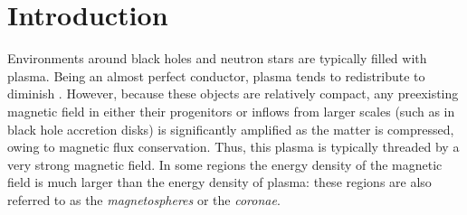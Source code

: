 \chapter{Introduction}

Environments around black holes and neutron stars are typically filled with plasma. Being an almost perfect conductor, plasma tends to redistribute to diminish . However, because these objects are relatively compact, any preexisting magnetic field in either their progenitors or inflows from larger scales (such as in black hole accretion disks) is significantly amplified as the matter is compressed, owing to magnetic flux conservation. Thus, this plasma is typically threaded by a very strong magnetic field. In some regions the energy density of the magnetic field is much larger than the energy density of plasma: these regions are also referred to as the \emph{magnetospheres} or the \emph{coronae}.


